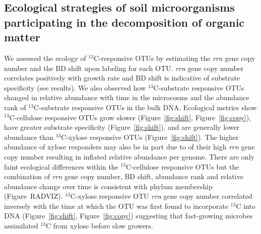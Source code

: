 \subsection{Ecological strategies of soil microorganisms participating in the
decomposition of organic matter}
We assessed the ecology of $^{13}$C-responsive OTUs by estimating the
\textit{rrn} gene copy number and the BD shift upon labeling for each OTU.
\textit{rrn} gene copy number correlates positively with growth rate
\citep{11125085} and BD shift is indicative of substrate specificity (see
results). We also observed how $^{13}$C-substrate responsive OTUs changed in
relative abundance with time in the microcosms and the abundance rank of
$^{13}$C-substrate responsive OTUs in the bulk DNA. Ecological metrics show
$^{13}$C-cellulose responsive OTUs grow slower (Figure~\ref{fig:shift},
Figure~\ref{fig:copy}), have greater substrate specificity
(Figure~\ref{fig:shift}), and are generally lower abundance than
$^{13}$C-xylose responsive OTUs (Figure~\ref{fig:shift}). The higher abundance
of xylose responders may also be in part due to of their high \textit{rrn} gene
copy number resulting in inflated relative abundance per genome. There are only
faint ecological differences within the $^{13}$C-cellulose responsive OTUs but
the combination of \textit{rrn} gene copy number, BD shift, abundance rank and
relative abundance change over time is consistent with phylum membership
(Figure~RADVIZ). $^{13}$C-xylose responsive OTU \textit{rrn} gene copy number
correlated inversely with the time at which the OTU was first found to
incorporate $^{13}$C into DNA (Figure~\ref{fig:shift}, Figure~\ref{fig:copy})
suggesting that fast-growing microbes assimilated $^{13}$C from xylose before
slow growers.  

